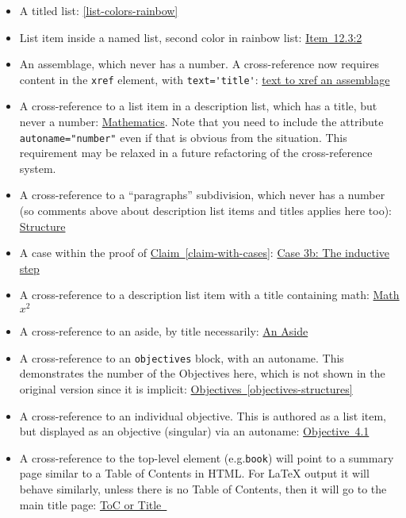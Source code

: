 \documentclass[10pt,]{article}
\theoremstyle{plain}
\theoremstyle{definition}
\theoremstyle{definition}
\theoremstyle{definition}
\theoremstyle{definition}
\theoremstyle{definition}
\theoremstyle{definition}
\numberwithin{equation}{section}
\begin{document}
\begin{itemize}[label=\textbullet]
\item{}\hypertarget{p-556}{}%
A titled list: \hyperref[list-colors-rainbow]{\ref{list-colors-rainbow}}%
\item{}\hypertarget{p-557}{}%
List item inside a named list, second color in rainbow list: \hyperlink{rainbow-orange}{Item~12.3:2}%
\item{}\hypertarget{p-558}{}%
An assemblage, which never has a number.  A cross-reference now requires content in the \lstinline?xref? element, with \lstinline?text='title'?: \hyperref[assemblage-basics]{text to xref an assemblage}%
\item{}\hypertarget{p-559}{}%
A cross-reference to a list item in a description list, which has a title, but never a number: \hyperlink{reserved-characters-mathematics}{Mathematics}.  Note that you need to include the attribute \lstinline?autoname="number"? even if that is obvious from the situation.  This requirement may be relaxed in a future refactoring of the cross-reference system.%
\item{}\hypertarget{p-560}{}%
A cross-reference to a ``paragraphs'' subdivision, which never has a number (so comments above about description list items and titles applies here too): \hyperlink{hierarchy-structure}{Structure}%
\item{}\hypertarget{p-561}{}%
A case within the proof of \hyperref[claim-with-cases]{Claim~\ref{claim-with-cases}}: \hyperlink{inductive-step}{Case 3b: The inductive step}%
\item{}\hypertarget{p-562}{}%
A cross-reference to a description list item with a title containing math: \hyperlink{description-list-math-title}{Math \(x^2\)}%
\item{}\hypertarget{p-563}{}%
A cross-reference to an aside, by title necessarily: \hyperref[an-aside]{An Aside}%
\item{}\hypertarget{p-564}{}%
A cross-reference to an \lstinline?objectives? block, with an autoname.  This demonstrates the number of the Objectives here, which is not shown in the original version since it is implicit: \hyperref[objectives-structures]{Objectives~\ref{objectives-structures}}%
\item{}\hypertarget{p-565}{}%
A cross-reference to an individual objective.  This is authored as a list item, but displayed as an objective (singular) via an autoname: \hyperlink{objective-structure}{Objective~4.1}%
\item{}\hypertarget{p-566}{}%
A cross-reference to the top-level element (e.g.\@\lstinline?book?) will point to a summary page similar to a Table of Contents in HTML.  For LaTeX output it will behave similarly, unless there is no Table of Contents, then it will go to the main title page:  \hyperlink{derivatives}{ToC or Title~}%

\end{itemize}
\end{document}
